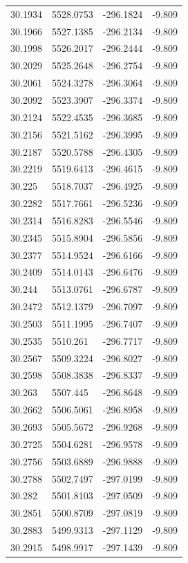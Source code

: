 \begin{table}[H]
\begin{tabular}{llll}
30.1934 & 5528.0753 & -296.1824 & -9.809 \\
30.1966 & 5527.1385 & -296.2134 & -9.809 \\
30.1998 & 5526.2017 & -296.2444 & -9.809 \\
30.2029 & 5525.2648 & -296.2754 & -9.809 \\
30.2061 & 5524.3278 & -296.3064 & -9.809 \\
30.2092 & 5523.3907 & -296.3374 & -9.809 \\
30.2124 & 5522.4535 & -296.3685 & -9.809 \\
30.2156 & 5521.5162 & -296.3995 & -9.809 \\
30.2187 & 5520.5788 & -296.4305 & -9.809 \\
30.2219 & 5519.6413 & -296.4615 & -9.809 \\
30.225 & 5518.7037 & -296.4925 & -9.809 \\
30.2282 & 5517.7661 & -296.5236 & -9.809 \\
30.2314 & 5516.8283 & -296.5546 & -9.809 \\
30.2345 & 5515.8904 & -296.5856 & -9.809 \\
30.2377 & 5514.9524 & -296.6166 & -9.809 \\
30.2409 & 5514.0143 & -296.6476 & -9.809 \\
30.244 & 5513.0761 & -296.6787 & -9.809 \\
30.2472 & 5512.1379 & -296.7097 & -9.809 \\
30.2503 & 5511.1995 & -296.7407 & -9.809 \\
30.2535 & 5510.261 & -296.7717 & -9.809 \\
30.2567 & 5509.3224 & -296.8027 & -9.809 \\
30.2598 & 5508.3838 & -296.8337 & -9.809 \\
30.263 & 5507.445 & -296.8648 & -9.809 \\
30.2662 & 5506.5061 & -296.8958 & -9.809 \\
30.2693 & 5505.5672 & -296.9268 & -9.809 \\
30.2725 & 5504.6281 & -296.9578 & -9.809 \\
30.2756 & 5503.6889 & -296.9888 & -9.809 \\
30.2788 & 5502.7497 & -297.0199 & -9.809 \\
30.282 & 5501.8103 & -297.0509 & -9.809 \\
30.2851 & 5500.8709 & -297.0819 & -9.809 \\
30.2883 & 5499.9313 & -297.1129 & -9.809 \\
30.2915 & 5498.9917 & -297.1439 & -9.809 \\

\end{tabular}
\end{table}

